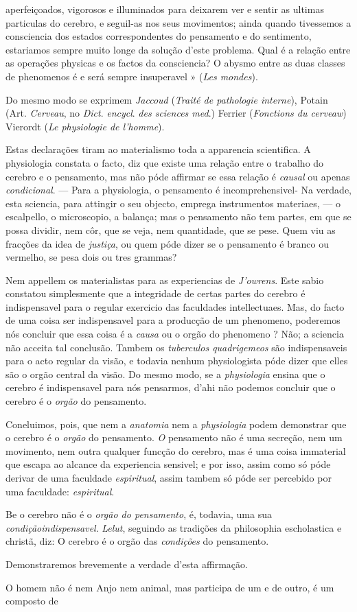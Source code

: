 aperfeiçoados, vigorosos e illuminados para deixarem ver e sentir as ultimas particulas do cerebro, e seguil-as nos seus movimentos; ainda quando tivessemos a consciencia dos estados correspondentes do pensamento e do sentimento, estariamos sempre muito longe da solução d'este problema. Qual é a relação entre as operações physicas e os factos da consciencia? O abysmo entre as duas classes de phenomenos é e será sempre insuperavel » (\emph{Les mondes}).\par Do mesmo modo se exprimem \emph{Jaccoud} (\emph{Traité de pathologie interne}), Potain (Art. \emph{Cerveau}, no \emph{Dict}. \emph{encycl}. \emph{des sciences med}.) Ferrier (\emph{Fonctions du cerveaw}) Vierordt (\emph{Le physiologie de l'homme}).\par Estas declarações tiram ao materialismo toda a apparencia scientifica. A physiologia constata o facto, diz que existe uma relação entre o trabalho do cerebro e o pensamento, mas não póde affirmar se essa relação é \emph{causal} ou apenas \emph{condicional}. --- Para a physiologia, o pensamento é incomprehensivel- Na verdade, esta sciencia, para attingir o seu objecto, emprega instrumentos materiaes, --- o escalpello, o microscopio, a balança; mas o pensamento não tem partes, em que se possa dividir, nem côr, que se veja, nem quantidade, que se pese. Quem viu as fracções da idea de \emph{justiça}, ou quem póde dizer se o pensamento é branco ou vermelho, se pesa dois ou tres grammas?\par Nem appellem os materialistas para as experiencias de \emph{J'owrens}. Este sabio constatou simplesmente que a integridade de certas partes do cerebro é indispensavel para o regular exercicio das faculdades intellectuaes. Mas, do facto de uma coisa ser indispensavel para a producção de um phenomeno, poderemos nós concluir que essa coisa é a \emph{causa} ou o orgão do phenomeno ? Não; a sciencia não acceita tal conclusão. Tambem os \emph{tuberculos quadrigemeos} são indispensaveis para o acto regular da visão, e todavia nenhum physiologista póde dizer que elles são o orgão central da visão. Do mesmo modo, se a \emph{physiologia} ensina que o cerebro é indispensavel para nós pensarmos, d'ahi não podemos concluir que o cerebro é o \emph{orgão} do pensamento.\par Coneluimos, pois, que nem a \emph{anatomia} nem a \emph{physiologia} podem demonstrar que o cerebro é o \emph{orgão} do pensamento. \emph{O} pensamento não é uma secreção, nem um movimento, nem outra qualquer funcção do cerebro, mas é uma coisa immaterial que escapa ao alcance da experiencia sensivel; e por isso, assim como só póde derivar de uma faculdade \emph{espiritual}, assim tambem só póde ser percebido por uma faculdade: \emph{espiritual}.\par Be o cerebro não é o \emph{orgão do pensamento}, é, todavia, uma sua \emph{condição}\emph{indispensavel}. \emph{Lelut}, seguindo as tradições da philosophia escholastica e christã, diz: O cerebro é o orgão das \emph{condições} do pensamento.\par Demonstraremos brevemente a verdade d'esta affirmação.\par O homem não é nem Anjo nem animal, mas participa de um e de outro, é um composto de 